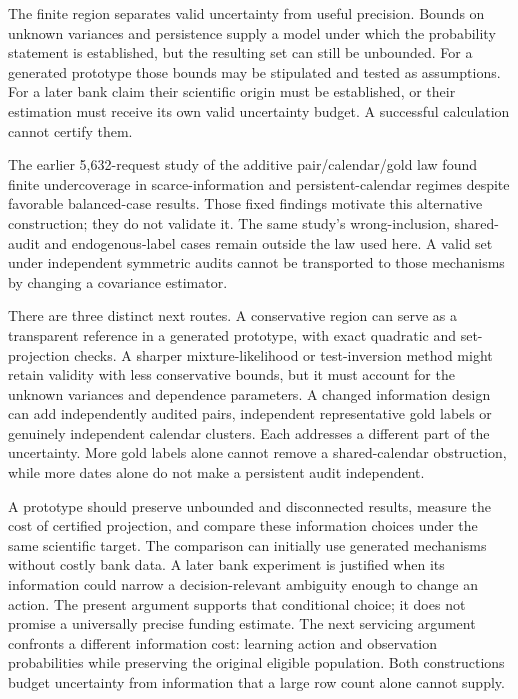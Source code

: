 The finite region separates valid uncertainty from useful precision.
Bounds on unknown variances and persistence supply a model under which
the probability statement is established, but the resulting set can
still be unbounded. For a generated prototype those bounds may be
stipulated and tested as assumptions. For a later bank claim their
scientific origin must be established, or their estimation must receive
its own valid uncertainty budget. A successful calculation cannot
certify them.

The earlier 5,632-request study of the additive pair/calendar/gold law
found finite undercoverage in scarce-information and persistent-calendar
regimes despite favorable balanced-case results. Those fixed findings
motivate this alternative construction; they do not validate it. The
same study's wrong-inclusion, shared-audit and endogenous-label cases
remain outside the law used here. A valid set under independent
symmetric audits cannot be transported to those mechanisms by changing a
covariance estimator. \citep{exec13_persistent_predecessor}

There are three distinct next routes. A conservative region can serve as
a transparent reference in a generated prototype, with exact quadratic
and set-projection checks. A sharper mixture-likelihood or
test-inversion method might retain validity with less conservative
bounds, but it must account for the unknown variances and dependence
parameters. A changed information design can add independently audited
pairs, independent representative gold labels or genuinely independent
calendar clusters. Each addresses a different part of the uncertainty.
More gold labels alone cannot remove a shared-calendar obstruction,
while more dates alone do not make a persistent audit independent.

A prototype should preserve unbounded and disconnected results, measure
the cost of certified projection, and compare these information choices
under the same scientific target. The comparison can initially use
generated mechanisms without costly bank data. A later bank experiment
is justified when its information could narrow a decision-relevant
ambiguity enough to change an action. The present argument supports that
conditional choice; it does not promise a universally precise funding
estimate. The next servicing argument confronts a different information cost: learning action and observation probabilities while preserving the original eligible population. Both constructions budget uncertainty from information that a large row count alone cannot supply. \label{exec13:persistent-region-end}
